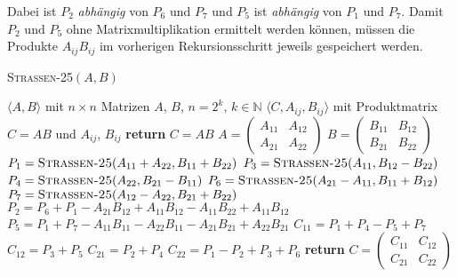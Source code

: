 \documentclass{report}
\numberwithin{equation}{section}
\begin{document}
Dabei ist $P_2$ \textit{abhängig} von $P_6$ und $P_7$ und $P_5$ ist \textit{abhängig} von $P_1$ und $P_7$. Damit $P_2$ und $P_5$ ohne Matrixmultiplikation ermittelt werden können, müssen die Produkte $A_{ij}B_{ij}$ im vorherigen Rekursionsschritt jeweils gespeichert werden.
\begin{algorithm}
	\caption{\textsc{Strassen-25}$(A, B)$}
	\label{alg:strassen25}
	\begin{algorithmic}[1]
		\Require $\langle A, B \rangle$ mit $n \times n$ Matrizen $A$, $B$, $n = 2^k$, $k \in \mathbb{N}$
		\Ensure $\langle C, A_{ij}, B_{ij} \rangle$ mit Produktmatrix $C = AB$ und $A_{ij}$, $B_{ij}$
		 \textbf{return} $C = AB$
		\EndIf
		\State $A = \begin{pmatrix} A_{11} & A_{12} \\ A_{21} & A_{22} \end{pmatrix}$
		\State $B = \begin{pmatrix} B_{11} & B_{12} \\ B_{21} & B_{22} \end{pmatrix}$
		\State $P_1 = \textsc{Strassen-25}(A_{11} + A_{22}, B_{11} + B_{22})$
		\State $P_3 = \textsc{Strassen-25}(A_{11}, B_{12} - B_{22})$
		\State $P_4 = \textsc{Strassen-25}(A_{22}, B_{21} - B_{11})$
		\State $P_6 = \textsc{Strassen-25}(A_{21} - A_{11}, B_{11} + B_{12})$
		\State $P_7 = \textsc{Strassen-25}(A_{12} - A_{22}, B_{21} + B_{22})$
		\State $P_2 = P_6 + P_1 - A_{21}B_{12} + A_{11}B_{12} - A_{11}B_{22} + A_{11}B_{12}$ 
		\State $P_5 = P_1 + P_7 - A_{11}B_{11} - A_{22}B_{11} - A_{21}B_{21} + A_{22}B_{21}$
		\State $C_{11} = P_1 + P_4 - P_5 + P_7$
		\State $C_{12} = P_3 + P_5$
		\State $C_{21} = P_2 + P_4$
		\State $C_{22} = P_1 - P_2 + P_3 + P_6$
		\State \textbf{return} $C = \begin{pmatrix} C_{11} & C_{12} \\ C_{21} & C_{22} \end{pmatrix}$
	\end{algorithmic}
\end{algorithm}
\end{document}
